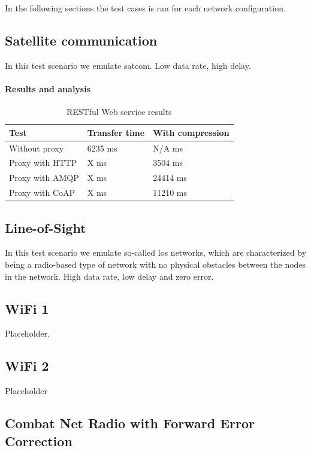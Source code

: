 In the following sections the test cases is ran for each network
configuration.


\subsection{Satellite communication}

In this test scenario we emulate \gls{satcom}. Low data rate, high delay.

\paragraph{Results and analysis}



\begin{table}[h!]
\begin{tabular}{| l | l | l |}
\hline
  \textbf{Test} & \textbf{Transfer time} & \textbf{With compression}\\ \hline
  Without proxy & 6235 ms & N/A ms \\ \hline
  Proxy with HTTP & X ms & 3504 ms \\ \hline
  Proxy with AMQP & X ms & 24414 ms \\ \hline
  Proxy with CoAP & X ms & 11210 ms \\ \hline
\end{tabular}
\caption{RESTful Web service results}
\end{table}

\subsection{Line-of-Sight}

In this test scenario we emulate so-called \gls{los} networks, which are
characterized by being a radio-based type of network with no physical obstacles
between the nodes in the network. High data rate, low delay and zero error.

\subsection{WiFi 1}

Placeholder.


\subsection{WiFi 2}

Placeholder

\subsection{Combat Net Radio with Forward Error Correction}

